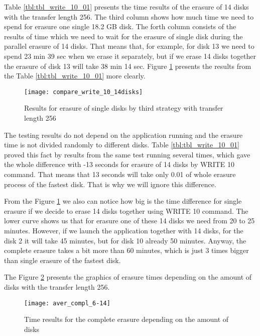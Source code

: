 \newpage
Table \ref{tbl:tbl_write_10_01} presents the time results of the erasure of 14 disks with the transfer length 256. The third column shows how much time we need to spend for erasure one single 18.2 GB disk. The forth column consists of the results of time which we need to wait for the erasure of single disk during the parallel erasure of 14 disks. That means that, for example, for disk 13 we need to spend 23 min 39 sec when we erase it separately, but if we erase 14 disks together the erasure of disk 13 will take 38 min 14 sec. Figure \ref{fig:compare_write_10_14disks} presents the results from the Table \ref{tbl:tbl_write_10_01} more clearly.

\begin{figure}[h!]
\begin{center}
  \texttt{[image: compare\_write\_10\_14disks]}
\end{center}
  \caption{Results for erasure of single disks by third strategy with transfer length 256}
  \label{fig:compare_write_10_14disks}
\end{figure}

The testing results do not depend on the application running and the erasure time is not divided randomly to different disks. Table \ref{tbl:tbl_write_10_01} proved this fact by results from the same test running several times, which gave the whole difference with -13 seconds for erasure of 14 disks by WRITE 10 command. That means that 13 seconds will take only 0.01 of whole erasure process of the fastest disk. That is why we will ignore this difference. 

From the Figure \ref{fig:compare_write_10_14disks} we also can notice how big is the time difference for single erasure if we decide to erase 14 disks together using WRITE 10 command. The lower curve shows us that for erasure one of these 14 disks we need from 20 to 25 minutes. However, if we launch the application together with 14 disks, for the disk 2 it will take 45 minutes, but for disk 10 already 50 minutes. Anyway, the complete erasure takes a bit more than 60 minutes, which is just 3 times bigger than single erasure of the fastest disk. 

The Figure \ref{fig:aver_compl_6-14} presents the graphics of erasure times depending on the amount of disks with the transfer length 256. 

\begin{figure}[h!]
\begin{center}
  \texttt{[image: aver\_compl\_6-14]}
\end{center}
  \caption{Time results for the complete erasure depending on the amount of disks}
  \label{fig:aver_compl_6-14}
\end{figure}

